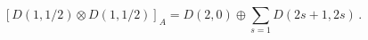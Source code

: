 \begin{equation}
\label{oneonehalf}
\left[D(1,1/2)\otimes D(1,1/2)\right]_A=D(2,0)\oplus \sum_{s=1} D(2s+1,2s)\,.
\end{equation}

